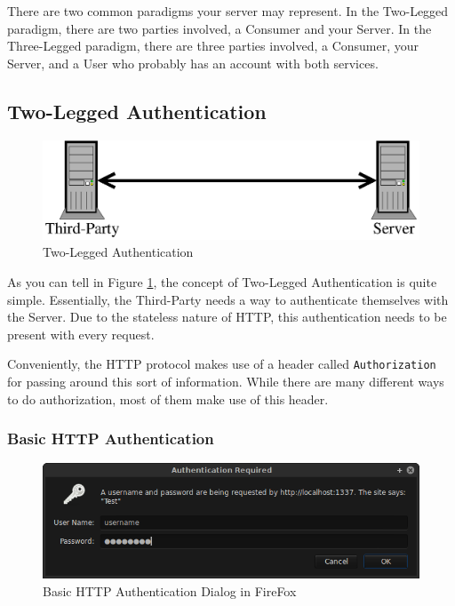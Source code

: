 \documentclass{book}
\begin{document}
There are two common paradigms your server may represent. In the Two-Legged paradigm, there are two parties involved, a Consumer and your Server. In the Three-Legged paradigm, there are three parties involved, a Consumer, your Server, and a User who probably has an account with both services.

\subsection{Two-Legged Authentication}

\begin{figure}[!htb]
\centering
\includegraphics[scale=.6]{images/two-legged.eps}
\caption{Two-Legged Authentication}
\label{fig:twolegged}
\end{figure}

As you can tell in Figure \ref{fig:twolegged}, the concept of Two-Legged Authentication is quite simple. Essentially, the Third-Party needs a way to authenticate themselves with the Server. Due to the stateless nature of HTTP, this authentication needs to be present with every request.

Conveniently, the HTTP protocol makes use of a header called \texttt{Authorization} for passing around this sort of information. While there are many different ways to do authorization, most of them make use of this header.

\subsubsection{Basic HTTP Authentication}

\begin{figure}[ht!]
\centering
\includegraphics[width=120mm]{images/basic-http-auth.png}
\caption{Basic HTTP Authentication Dialog in FireFox}
\label{fig:basichhtpauth}
\end{figure}
\end{document}
